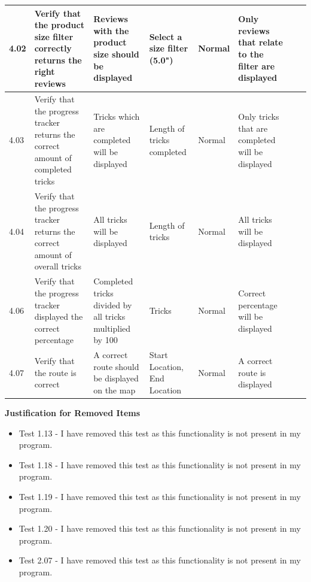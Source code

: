 \begin{landscape}
\begin{center}
\begin{longtable}{|p{1.5cm}|p{2.5cm}|p{2.5cm}|p{2cm}|p{2cm}|p{2cm}|p{2cm}|p{2cm}|}
4.02 & Verify that the product size filter correctly returns the right reviews & Reviews with the product size should be displayed & Select a size filter (5.0") & Normal & Only reviews that relate to the filter are displayed & & \\ \hline

4.03 & Verify that the progress tracker returns the correct amount of completed tricks & Tricks which are completed will be displayed & Length of tricks completed & Normal & Only tricks that are completed will be displayed & & \\ \hline

4.04 & Verify that the progress tracker returns the correct amount of overall tricks & All tricks will be displayed & Length of tricks & Normal & All tricks will be displayed & & \\ \hline

4.06 & Verify that the progress tracker displayed the correct percentage & Completed tricks divided by all tricks multiplied by 100  & Tricks &  Normal & Correct percentage will be displayed & & \\ \hline

4.07 & Verify that the route is correct & A correct route should be displayed on the map & Start Location, End Location & Normal & A correct route is displayed & & \\ \hline


    \end{longtable}
\end{center}

\textbf{Justification for Removed Items}

\begin{itemize}

\item Test 1.13 - I have removed this test as this functionality is not present in my program.

\item Test 1.18 - I have removed this test as this functionality is not present in my program.

\item Test 1.19 - I have removed this test as this functionality is not present in my program.

\item Test 1.20 - I have removed this test as this functionality is not present in my program.

\item Test 2.07 - I have removed this test as this functionality is not present in my program.


\end{itemize}
\end{landscape}
